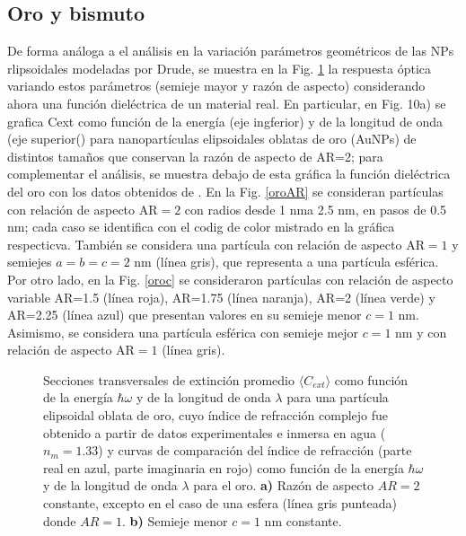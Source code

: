 \subsection*{Oro y bismuto}
De forma análoga a el análisis en la variación parámetros geométricos de las NPs rlipsoidales modeladas por Drude, se muestra en la Fig. \ref{oro} la respuesta óptica variando estos parámetros (semieje mayor y razón de aspecto) considerando ahora una función dieléctrica de un material real. En particular, en Fig. 10a) se grafica Cext como función de la energía (eje ingferior) y de la longitud de onda (eje superior() para nanopartículas elipsoidales oblatas de oro (AuNPs) de distintos tamaños que conservan la razón de aspecto de AR=2; para complementar el análisis, se muestra debajo de esta gráfica la función dieléctrica del oro con los datos obtenidos de \cite{Plata}. En la Fig. \ref{oroAR} se consideran partículas con relación de aspecto AR$=2$ con radios desde 1  nma 2.5 nm, en pasos de 0.5 nm; cada caso se identifica con el codig de color mistrado en la gráfica respecticva. También se considera una partícula con relación de aspecto AR$=1$ y semiejes $a=b=c=2$ nm (línea gris), que representa a una partícula esférica. Por otro lado, en la Fig. \ref{oroc} se consideraron partículas con relación de aspecto variable AR=1.5 (línea roja), AR=1.75 (línea naranja), AR=2 (línea verde) y AR=2.25 (línea azul) que presentan valores en su semieje menor $c=1\text{ nm}$. Asimismo, se considera una partícula esférica con semieje mejor $c=1\text{ nm}$ y con relación de aspecto AR$=1$ (línea gris).
\begin{figure}[H]
	\quad%
	\caption{Secciones transversales de extinción promedio $\langle C_{ext}\rangle$ como función de la energía $\hbar\omega$ y de la longitud de onda $\lambda$ para una partícula elipsoidal oblata de oro, cuyo índice de refracción complejo fue obtenido a partir de datos experimentales  e inmersa en agua ($n_m=1.33$) y curvas de comparación del índice de refracción (parte real en azul, parte imaginaria en rojo) como función de la energía $\hbar\omega$ y de la longitud de onda $\lambda$ para el oro. \textbf{a)} Razón de aspecto $AR=2$ constante, excepto en el caso de una esfera (línea gris punteada) donde $AR=1$. \textbf{b)} Semieje menor $c=1$ nm constante.}\label{oro}
\end{figure}

